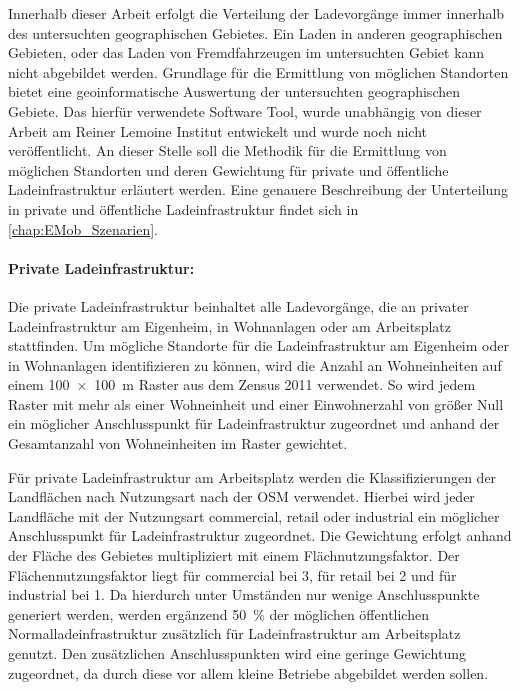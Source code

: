 Innerhalb dieser Arbeit erfolgt die Verteilung der Ladevorgänge immer innerhalb des untersuchten geographischen Gebietes.
Ein Laden in anderen geographischen Gebieten, oder das Laden von \glqq Fremdfahrzeugen\grqq{} im untersuchten Gebiet kann nicht abgebildet werden.
Grundlage für die Ermittlung von möglichen Standorten bietet eine geoinformatische Auswertung der untersuchten geographischen Gebiete.
Das hierfür verwendete Software Tool, wurde unabhängig von dieser Arbeit am Reiner Lemoine Institut entwickelt und wurde noch nicht veröffentlicht.
An dieser Stelle soll die Methodik für die Ermittlung von möglichen Standorten und deren Gewichtung für private und öffentliche Ladeinfrastruktur erläutert werden.
Eine genauere Beschreibung der Unterteilung in private und öffentliche Ladeinfrastruktur findet sich in \autoref{chap:EMob_Szenarien}.


\paragraph{Private Ladeinfrastruktur:}

Die private Ladeinfrastruktur beinhaltet alle Ladevorgänge, die an privater Ladeinfrastruktur am Eigenheim, in Wohnanlagen oder am Arbeitsplatz stattfinden.
Um mögliche Standorte für die Ladeinfrastruktur am Eigenheim oder in Wohnanlagen identifizieren zu können, wird die Anzahl an Wohneinheiten auf einem \SI{100 x 100}{\m} Raster aus dem Zensus 2011 \cite{StatistischesBundesamt2011} verwendet.
So wird jedem Raster mit mehr als einer Wohneinheit und einer Einwohnerzahl von größer Null ein möglicher Anschlusspunkt für Ladeinfrastruktur zugeordnet und anhand der Gesamtanzahl von Wohneinheiten im Raster gewichtet.\medskip

Für private Ladeinfrastruktur am Arbeitsplatz werden die Klassifizierungen der Landflächen nach Nutzungsart nach der \gls{OSM} \cite{OpenStreetMapFoundation} verwendet.
Hierbei wird jeder Landfläche mit der Nutzungsart \glqq commercial\grqq , \glqq retail\grqq{} oder \glqq industrial\grqq{} ein möglicher Anschlusspunkt für Ladeinfrastruktur zugeordnet.
Die Gewichtung erfolgt anhand der Fläche des Gebietes multipliziert mit einem Flächnutzungsfaktor.
Der Flächennutzungsfaktor liegt für \glqq commercial\grqq{} bei \num{3}, für \glqq retail\grqq{} bei \num{2} und für \glqq industrial\grqq{} bei \num{1}.
Da hierdurch unter Umständen nur wenige Anschlusspunkte generiert werden, werden ergänzend \SI{50}{\percent} der möglichen öffentlichen Normalladeinfrastruktur zusätzlich für Ladeinfrastruktur am Arbeitsplatz genutzt.
Den zusätzlichen Anschlusspunkten wird eine geringe Gewichtung zugeordnet, da durch diese vor allem kleine Betriebe abgebildet werden sollen.



